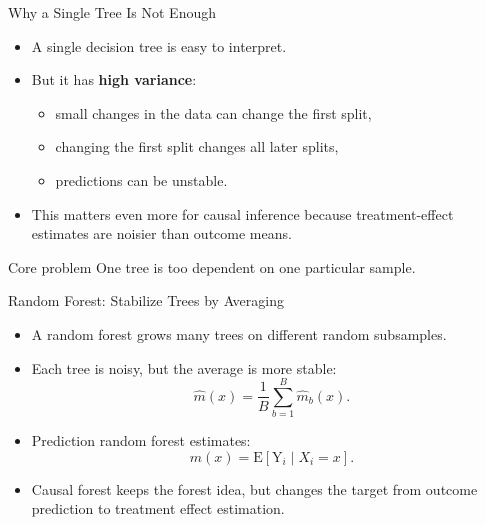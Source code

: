 \documentclass[hyperref={pdfpagelabels=false}]{beamer}
\begin{document}
\begin{frame}{Why a Single Tree Is Not Enough}
\begin{itemize}
  \item A single decision tree is easy to interpret.
  \vspace{0.2cm}
  \item But it has \textbf{high variance}:
  \vspace{0.1cm}
  \begin{itemize}
    \item small changes in the data can change the first split,
    \item changing the first split changes all later splits,
    \item predictions can be unstable.
  \end{itemize}
  \vspace{0.25cm}
  \item This matters even more for causal inference because treatment-effect estimates are noisier than outcome means.
\end{itemize}

\vspace{0.2cm}
\begin{block}{Core problem}
One tree is too dependent on one particular sample.
\end{block}
\end{frame}

\begin{frame}{Random Forest: Stabilize Trees by Averaging}
\begin{itemize}
  \item A random forest grows many trees on different random subsamples.
  \vspace{0.2cm}
  \item Each tree is noisy, but the average is more stable:
  \[
    \hat{m}(x)=\frac{1}{B}\sum_{b=1}^B \hat{m}_b(x).
  \]
  \vspace{0.2cm}
  \item Prediction random forest estimates:
  \[
    m(x)=\mathrm{E}\!\left[\mathrm{Y}_i\mid X_i=x\right].
  \]
  \vspace{0.2cm}
  \item Causal forest keeps the forest idea, but changes the target from outcome prediction to treatment effect estimation.
\end{itemize}
\end{frame}
\end{document}
